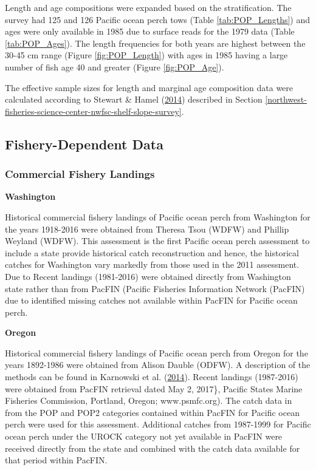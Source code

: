 \documentclass[12pt,]{article}
\begin{document}
Length and age compositions were expanded based on the stratification.
The survey had 125 and 126 Pacific ocean perch tows (Table
\ref{tab:POP_Lengths}) and ages were only available in 1985 due to
surface reads for the 1979 data (Table \ref{tab:POP_Ages}). The length
frequencies for both years are highest between the 30-45 cm range
(Figure \ref{fig:POP_Length}) with ages in 1985 having a large number of
fish age 40 and greater (Figure \ref{fig:POP_Age}).

The effective sample sizes for length and marginal age composition data
were calculated according to Stewart \& Hamel
(\protect\hyperlink{ref-stewart_bootstrapping_2014}{2014}) described in
Section
\ref{northwest-fisheries-science-center-nwfsc-shelf-slope-survey}.

\subsection{Fishery-Dependent Data}\label{fishery-dependent-data}

\subsubsection{Commercial Fishery
Landings}\label{commercial-fishery-landings}

\textbf{Washington}

Historical commercial fishery landings of Pacific ocean perch from
Washington for the years 1918-2016 were obtained from Theresa Tsou
(WDFW) and Phillip Weyland (WDFW). This assessment is the first Pacific
ocean perch assessment to include a state provide historical catch
reconstruction and hence, the historical catches for Washington vary
markedly from those used in the 2011 assessment. Due to Recent landings
(1981-2016) were obtained directly from Washington state rather than
from PacFIN (Pacific Fisheries Information Network (PacFIN) due to
identified missing catches not available within PacFIN for Pacific ocean
perch.

\textbf{Oregon}

Historical commercial fishery landings of Pacific ocean perch from
Oregon for the years 1892-1986 were obtained from Alison Dauble (ODFW).
A description of the methods can be found in Karnowski et al.
(\protect\hyperlink{ref-karnowski_historical_2014}{2014}). Recent
landings (1987-2016) were obtained from PacFIN retrieval dated May 2,
2017\}, Pacific States Marine Fisheries Commission, Portland, Oregon;
www.psmfc.org). The catch data in from the POP and POP2 categories
contained within PacFIN for Pacific ocean perch were used for this
assessment. Additional catches from 1987-1999 for Pacific ocean perch
under the UROCK category not yet available in PacFIN were received
directly from the state and combined with the catch data available for
that period within PacFIN.
\end{document}
